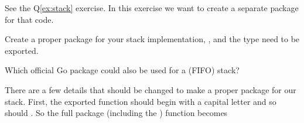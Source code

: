 \begin{Exercise}[title={Stack as package},difficulty=2]
\label{ex:stack-package}
\Question\label{ex:stack-package q1} 
See the Q\ref{ex:stack} exercise. In this exercise we want to create
a separate package for that code.

Create a proper package for your
stack implementation, ,  and the  type need to be
exported.

\Question\label{ex:stack-package q2} Which official Go package could
also be used for a (FIFO) stack?

\end{Exercise}

\begin{Answer}
\Question There are a few details that should be changed to make a proper package
for our stack. First, the exported function should begin with a capital 
letter and so should . So the full package (including the
) function becomes


\end{Answer}
